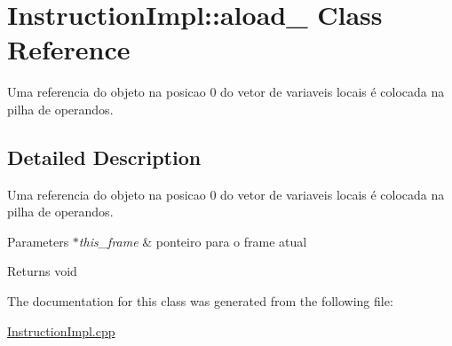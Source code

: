 \hypertarget{class_instruction_impl_1_1aload__0}{}\section{Instruction\+Impl\+:\+:aload\+\_ Class Reference}
\label{class_instruction_impl_1_1aload__0}


Uma referencia do objeto na posicao 0 do vetor de variaveis locais é colocada na pilha de operandos.  




\subsection{Detailed Description}
Uma referencia do objeto na posicao 0 do vetor de variaveis locais é colocada na pilha de operandos. 


\begin{DoxyParams}{Parameters}
{\em $\ast$this\+\_\+frame} & ponteiro para o frame atual \\
\hline
\end{DoxyParams}
\begin{DoxyReturn}{Returns}
void 
\end{DoxyReturn}


The documentation for this class was generated from the following file\+:\begin{DoxyCompactItemize}
\item 
\hyperlink{_instruction_impl_8cpp}{Instruction\+Impl.\+cpp}\end{DoxyCompactItemize}

